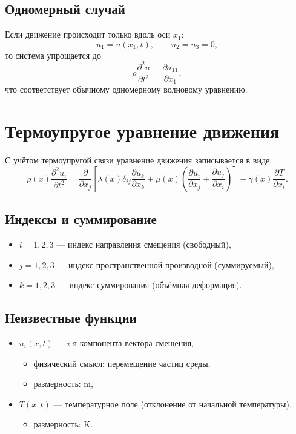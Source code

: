 \subsection{Одномерный случай}

Если движение происходит только вдоль оси $x_1$:
\[
u_1 = u(x_1,t), \qquad u_2 = u_3 = 0,
\]
то система упрощается до
\begin{equation}
\rho \frac{\partial^2 u}{\partial t^2}
=
\frac{\partial \sigma_{11}}{\partial x_1},
\end{equation}
что соответствует обычному одномерному волновому уравнению.


\section{Термоупругое уравнение движения}

С учётом термоупругой связи уравнение движения записывается в виде:
\begin{equation}
\rho(x)\frac{\partial^2 u_i}{\partial t^2}
=
\frac{\partial}{\partial x_j}
\left[
\lambda(x)\delta_{ij}\frac{\partial u_k}{\partial x_k}
+
\mu(x)\left(
\frac{\partial u_i}{\partial x_j}
+
\frac{\partial u_j}{\partial x_i}
\right)
\right]
-
\gamma(x)\frac{\partial T}{\partial x_i}.
\end{equation}

\subsection{Индексы и суммирование}

\begin{itemize}
    \item $i = 1,2,3$ — индекс направления смещения (свободный),
    \item $j = 1,2,3$ — индекс пространственной производной (суммируемый),
    \item $k = 1,2,3$ — индекс суммирования (объёмная деформация).
\end{itemize}

\subsection{Неизвестные функции}

\begin{itemize}
    \item $u_i(x,t)$ — $i$-я компонента вектора смещения,
    \begin{itemize}
        \item физический смысл: перемещение частиц среды,
        \item размерность: $\mathrm{m}$,
    \end{itemize}
    \item $T(x,t)$ — температурное поле (отклонение от начальной температуры),
    \begin{itemize}
        \item размерность: $\mathrm{K}$.
    \end{itemize}
\end{itemize}


